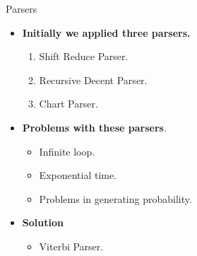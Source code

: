 \documentclass{beamer}
\begin{document}
\begin{frame}{Parsers}
\begin{itemize}
	\item \textbf{Initially we applied three parsers.} \\
	\vspace{0.5em}
	\begin{enumerate}
	\item Shift Reduce Parser.
	\item Recursive Decent Parser.
	\item Chart Parser.
	\end{enumerate}
	\vspace{1em}
	\item  \textbf{Problems with these parsers}. \\
	\vspace{0.5em}
	\begin{itemize}
	\item Infinite loop.
	\item Exponential time.
	\item Problems in generating probability.
	\end{itemize}
	\vspace{1em}
	\item \textbf{Solution}
	\vspace{0.5em}
	\begin{itemize}
	\item Viterbi Parser.
	\end{itemize}	
	\vspace{1em} 
\end{itemize}
\end{frame}
\end{document}
